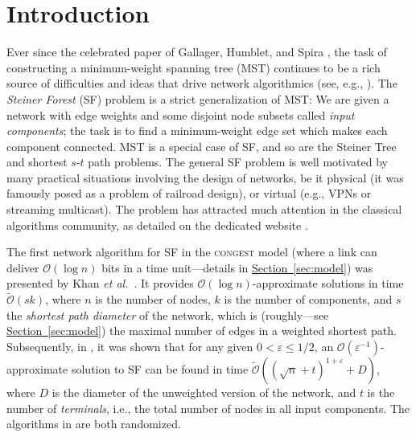 \documentclass[letterpaper,11pt]{article}
\newcommand{\namedref}[2]{\hyperref[#2]{#1~\ref*{#2}}}
\newcommand{\sectionref}[1]{\namedref{Section}{#1}}
\newcommand{\BO}{\mathcal{O}}
\newcommand{\sO}{\tilde{\mathcal{O}}}
\newcommand{\Congest}{\textsc{congest}\xspace}
\begin{document}
\section{Introduction}
Ever since the celebrated paper of Gallager, Humblet, and Spira \cite{GHS-83},
the task of constructing a minimum-weight spanning tree (MST) continues to be
a rich source of difficulties and ideas that drive network algorithmics (see,
e.g., \cite{Elkin-MST,GarayKP-98,LotkerPP,PelegR-00}).
The \emph{Steiner Forest} (SF) problem is a strict generalization of MST: We are
given a network with edge weights and some disjoint node subsets called
\emph{input components}; the task is to find a minimum-weight edge set which
makes each component connected. MST is a special case of SF, and so are the
Steiner Tree and shortest $s$-$t$ path problems.
The general SF problem is well motivated by many practical situations involving
the design of networks, be it physical (it was famously posed as a problem of
railroad design), or virtual (e.g., VPNs or streaming multicast). The problem
has attracted much attention in the classical algorithms community, as detailed
on the dedicated website \cite{Steiner-site}.

The first network algorithm for
SF in the \Congest model (where a link can deliver $\BO(\log n)$ bits in a
time unit---details in \sectionref{sec:model}) was presented by
Khan \textit{et al.}\ \cite{KKMPT-12}. 
It provides $\BO(\log n)$-approximate solutions in time $\sO(sk)$, where $n$ is
the number of nodes, $k$ is the number of components, and $s$ the \emph{shortest
path diameter} of the network, which is
(roughly---see \sectionref{sec:model})  the maximal number of edges in a weighted shortest path. Subsequently, in \cite{LenzenP13}, it was shown that for any given
$0<\varepsilon\le1/2$, an $\BO(\varepsilon^{-1})$-approximate solution to SF can
be found in time $\sO((\sqrt n+t)^{1+\varepsilon}+D)$, where $D$ is the diameter
of the unweighted version of the network, and $t$ is the number of
\emph{terminals}, i.e., the total number of nodes in all input components.  The
algorithms in \cite{KKMPT-12,LenzenP13} are both randomized.
\end{document}
